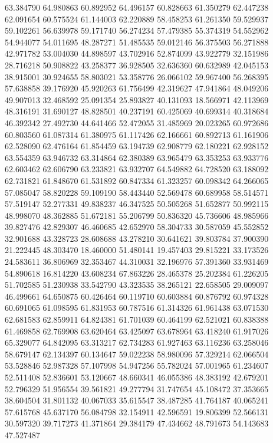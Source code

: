 63.384790
64.980863
60.892952
64.496157
60.828663
61.350279
62.447238
62.091654
60.575524
61.144003
62.220889
58.458253
61.261350
59.529937
59.102261
56.639978
59.171740
56.274234
57.479385
55.374319
54.552962
54.944077
54.011695
48.287271
51.485535
59.012146
56.375503
56.271888
42.971782
53.004030
44.898597
43.702916
52.874099
43.922779
32.151986
28.716218
50.908822
43.258377
36.928505
32.636360
60.632989
42.045153
38.915001
30.924655
58.803021
53.358776
26.066102
59.967400
56.268395
57.638858
39.176920
45.920263
61.756499
42.319627
47.941864
48.049206
49.907013
32.468592
25.091354
25.893827
40.131093
18.566971
42.113969
48.316191
31.690127
48.828501
40.237191
60.425069
40.699314
40.318684
46.392342
27.492730
44.641466
52.472055
31.485969
20.023265
60.972686
60.803560
61.087314
61.380975
61.117426
62.166661
60.892713
61.161906
62.528090
62.476164
61.854459
63.194739
62.908779
62.180221
62.928152
63.554359
63.946732
63.314864
62.380389
63.965479
63.353253
63.933776
62.603462
62.606790
63.233821
63.932707
64.549882
64.728520
63.188092
62.731821
61.848670
61.531892
60.847334
61.323257
60.098342
64.266065
57.085047
58.820228
59.109190
58.443440
52.569478
60.689958
58.514571
57.519147
52.277331
49.838237
46.347525
50.505268
51.652877
50.992115
48.998070
48.362885
51.672181
55.206799
50.836320
45.736606
48.985966
39.827476
42.829307
46.460685
42.652970
58.304733
30.587059
45.552852
32.901688
43.328723
28.608688
43.278210
30.641621
39.803784
37.900390
21.222445
48.303470
18.460000
51.480141
19.457403
29.815221
33.173526
24.583611
36.806969
32.353467
44.310031
32.196976
57.391360
33.931469
54.890618
16.814220
43.608234
67.863226
28.465378
25.202384
61.226205
51.702585
51.230938
33.542790
43.323535
38.265121
22.658505
29.009097
46.499661
64.650875
60.426464
60.119710
60.603884
60.876792
60.974328
60.691065
61.098595
61.831953
60.787516
61.314326
61.961438
63.071530
62.681583
62.859911
64.824381
61.701039
60.464199
62.521021
60.838388
61.469858
62.769908
63.620464
63.425097
63.678964
63.418240
61.917026
65.329077
64.842095
63.313217
62.734283
61.927463
63.116236
63.258046
58.679147
62.134397
60.134647
59.022238
58.980096
57.329214
62.066504
53.528846
52.987328
57.107998
54.947256
55.782024
57.001965
61.234607
52.511408
52.836601
53.120667
48.660341
46.055386
48.383192
42.679201
52.796329
51.956554
39.561821
49.277794
31.747654
45.108472
37.353665
38.604504
31.801132
40.067033
35.615547
38.487285
41.764187
40.065241
57.615768
45.637170
56.084798
32.154911
42.596591
19.806399
52.566131
30.597320
39.717273
41.371864
29.384179
47.434662
48.791673
54.143683
47.527487
